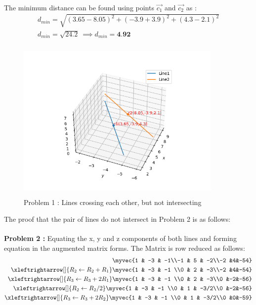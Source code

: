 \documentclass[journal,12pt,twocolumn]{IEEEtran}
\begin{document}
\\
The minimum distance can be found using points $\vec{c_1}$ and $\vec{c_2}$ as :
\begin{align}
    d_{min}=\sqrt{(3.65-8.05)^2+(-3.9+3.9)^2+(4.3-2.1)^2}\\
    d_{min}=\sqrt{24.2} \ \implies d_{min}=\textbf{4.92} 
\end{align}
\begin{figure}[ht]
\centering
\includegraphics[width=10cm, height=8cm]{Figure_1}
\caption{Problem 1 : Lines crossing each other, but not intersecting}
\label{Fig2}
\end{figure}
\newpage \noindent
The proof that the pair of lines do not intersect in Problem 2 is as follows:\\
\\
\textbf{Problem 2 :} Equating the x, y and z components of both lines and forming equation in the augmented matrix forms. The Matrix is row reduced as follows:\\
\begin{align}
\myvec{1 & -3 & -1\\-1 & 5 & -2\\-2 &4&-54}\\
\xleftrightarrow[]{R_2\leftarrow R_2+R_1}
\myvec{1 & -3 & -1 \\0 & 2 & -3\\-2 &4&-54}\\
\xleftrightarrow[]{R_3\leftarrow R_3+2R_1}   
\myvec{1 & -3 & -1 \\0 & 2 & -3\\0 &-2&-56}\\
\xleftrightarrow[]{R_2\leftarrow R_2/2}
\myvec{1 & -3 & -1 \\0 & 1 & -3/2\\0 &-2&-56}\\
\xleftrightarrow[]{R_3\leftarrow R_3+2R_2}
\myvec{1 & -3 & -1 \\0 & 1 & -3/2\\0 &0&-59}
\end{align} 
\end{document}
